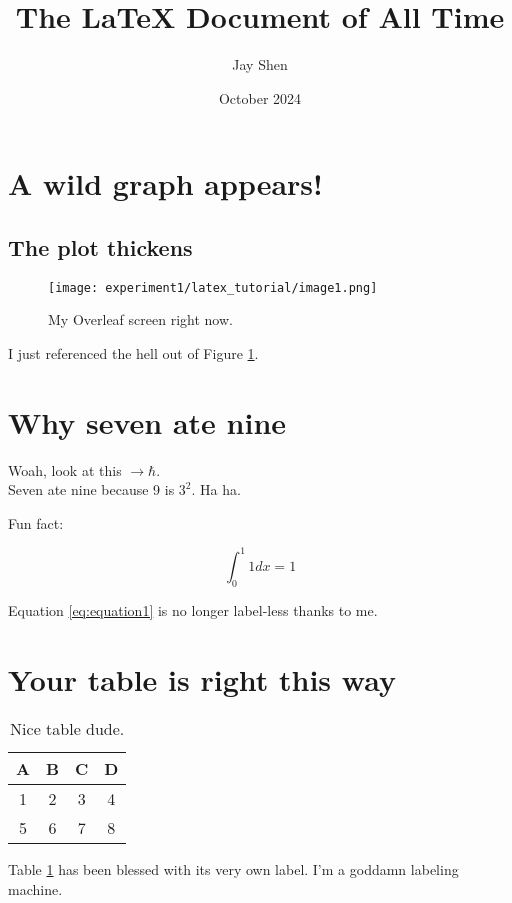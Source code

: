 \documentclass[12pt, letterpaper]{article}
\title{The \LaTeX{} Document of All Time}
\author{Jay Shen}
\date{October 2024}
\begin{document}
\maketitle

\section{A wild graph appears!}
\subsection{The plot thickens}

\begin{figure}[h]
    \centering
    \texttt{[image: experiment1/latex\_tutorial/image1.png]}
    \caption{My Overleaf screen right now. }
    \label{fig:image1}
\end{figure}

I just referenced the hell out of Figure \ref{fig:image1}. 

\section{Why seven ate nine}

Woah, look at this $\rightarrow \hbar$. 
\\
Seven ate nine because 9 is $3^2$. 
Ha ha. 

Fun fact:

\begin{equation} \label{eq:equation1}
    \int^1_0 1 dx = 1
\end{equation}

Equation \ref{eq:equation1} is no longer label-less thanks to me. 

\section{Your table is right this way}

\begin{table}[h!]
\centering
\begin{tabular}{|c c c c|} 
    \hline
    \textbf{A} & \textbf{B} & \textbf{C} & \textbf{D} \\
    \hline
    1 & 2 & 3 & 4 \\ 
    5 & 6 & 7 & 8 \\
    \hline
\end{tabular}
\caption{Nice table dude. }
\label{table:1}
\end{table}

Table \ref{table:1} has been blessed with its very own label. 
I'm a goddamn labeling machine. 
\end{document}
